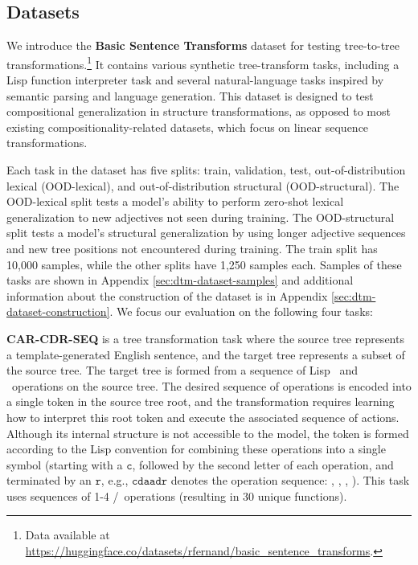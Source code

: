 \subsection{Datasets} \label{sec:dtm-datasets}
We introduce the \textbf{Basic Sentence Transforms} dataset for testing tree-to-tree transformations.\footnote{Data available at \url{https://huggingface.co/datasets/rfernand/basic_sentence_transforms}.} It contains various synthetic tree-transform tasks, including a Lisp function interpreter task and several natural-language tasks inspired by semantic parsing and language generation. This dataset is designed to test compositional generalization in structure transformations, as opposed to most existing compositionality-related datasets, which focus on linear sequence transformations.

Each task in the dataset has five splits: train, validation, test, out-of-distribution lexical (OOD-lexical), and out-of-distribution structural (OOD-structural). The OOD-lexical split tests a model's ability to perform zero-shot lexical generalization to new adjectives not seen during training. The OOD-structural split tests a model's structural generalization by using longer adjective sequences and new tree positions not encountered during training. The train split has 10,000 samples, while the other splits have 1,250 samples each. Samples of these tasks are shown in Appendix \ref{sec:dtm-dataset-samples} and additional information about the construction of the dataset is in Appendix \ref{sec:dtm-dataset-construction}. We focus our evaluation on the following four tasks:

\textbf{CAR-CDR-SEQ} is a tree transformation task where the source tree represents a template-generated English sentence, and the target tree represents a subset of the source tree. The target tree is formed from a sequence of Lisp \car\ and \cdr\ operations on the source tree. The desired sequence of operations is encoded into a single token in the source tree root, and the transformation requires learning how to interpret this root token and execute the associated sequence of actions. Although its internal structure is not accessible to the model, the token is formed according to the Lisp convention for combining these operations into a single symbol (starting with a $\mathtt{c}$, followed by the second letter of each operation, and terminated by an $\mathtt{r}$, e.g., $\mathtt{cdaadr}$ denotes the operation sequence: \cdr, \car, \car, \cdr). This task uses sequences of 1-4 \car/\cdr\ operations (resulting in 30 unique functions).

